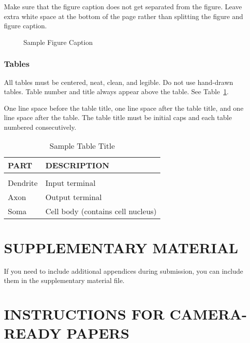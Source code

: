 \documentclass[twoside]{article}
\begin{document}
Make sure that the figure caption does not get separated from the
figure. Leave extra white space at the bottom of the page rather than
splitting the figure and figure caption.
\begin{figure}[h]
\vspace{.3in}
\centerline{}
\vspace{.3in}
\caption{Sample Figure Caption}
\end{figure}

\subsubsection{Tables}

All tables must be centered, neat, clean, and legible. Do not use hand-drawn tables. Table number and title always appear above the table.
See Table~\ref{sample-table}.

One line space before the table title, one line space after the table title, and one line space after the table. The table title must be
initial caps and each table numbered consecutively.

\begin{table}[h]
\caption{Sample Table Title} \label{sample-table}
\begin{center}
\begin{tabular}{ll}
{\bf PART}  &{\bf DESCRIPTION} \\
\hline \\
Dendrite         &Input terminal \\
Axon             &Output terminal \\
Soma             &Cell body (contains cell nucleus) \\
\end{tabular}
\end{center}
\end{table}

\section{SUPPLEMENTARY MATERIAL}

If you need to include additional appendices during submission, you
can include them in the supplementary material file.


\newpage

\section{INSTRUCTIONS FOR CAMERA-READY PAPERS}
\end{document}
